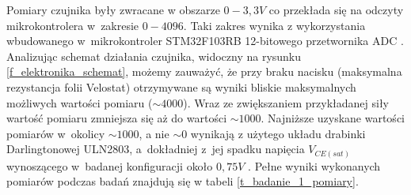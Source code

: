 Pomiary czujnika były zwracane w obszarze $0-3,3V$ co przekłada się na odczyty mikrokontrolera w~zakresie $0-4096$. Taki zakres wynika z wykorzystania wbudowanego w~mikrokontroler STM32F103RB 12-bitowego przetwornika ADC \cite{b_site_F103RB}. Analizując schemat działania czujnika, widoczny na rysunku \ref{f_elektronika_schemat}, możemy zauważyć, że przy braku nacisku (maksymalna rezystancja folii Velostat) otrzymywane są wyniki bliskie maksymalnych możliwych wartości pomiaru ($\sim4000$). Wraz ze zwiększaniem przykładanej siły wartość pomiaru zmniejsza się aż do wartości $\sim1000$. Najniższe uzyskane wartości pomiarów w~okolicy $\sim1000$, a nie $\sim0$ wynikają z użytego układu drabinki Darlingtonowej ULN2803, a~dokładniej z~jej spadku napięcia $V_{CE(sat)}$ wynoszącego w~badanej konfiguracji około $0,75 V$ \cite{b_site_ULN2803}. Pełne wyniki wykonanych pomiarów podczas badań znajdują się w tabeli \ref{t_badanie_1_pomiary}.

